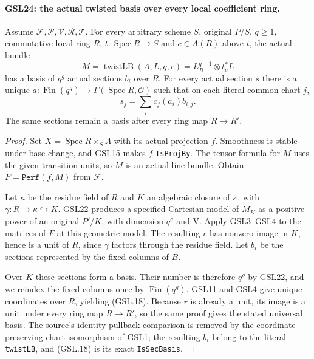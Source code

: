 \documentclass[11pt,a4paper]{article}
\numberwithin{equation}{section}
\theoremstyle{remark}\newtheorem{remark}[theorem]{Remark}
\begin{document}
\paragraph{GSL24: the actual twisted basis over every local coefficient ring.}
\label{claim:GSL24}
Assume $\mathcal F,\mathcal P,\mathcal V,\mathcal R,\mathcal T$.
For every arbitrary scheme $S$, original $P/S$, $q\ge1$,
commutative local ring $R$, $t:\operatorname{Spec}R\to S$
and $c\in A(R)$ above $t$, the actual bundle
\[
 M=\operatorname{twistLB}(A,L,q,c)
     =L_R^{q-1}\otimes t_c^*L
\]
has a basis of $q^g$ actual sections $b_i$ over $R$.
For every actual section $s$ there is a unique
$a:\operatorname{Fin}(q^g)\to\Gamma(\operatorname{Spec}R,\mathcal O)$
such that on each literal common chart $j$,
\[
 s_j=\sum_i c_f(a_i)b_{i,j}. \tag{GSL.18}
\]
The same sections remain a basis after every ring map $R\to R'$.

\begin{proof}
Set $X=\operatorname{Spec}R\times_S A$ with its actual projection
$f$.  Smoothness is stable under base change, and GSL15 makes
$f$ \texttt{Is\allowbreak Proj\allowbreak By}.  The tensor formula for $M$ uses the
given transition units, so $M$ is an actual line bundle.
Obtain $F=\texttt{Perf}(f,M)$ from $\mathcal F$.

Let $\kappa$ be the residue field of $R$ and $K$ an algebraic
closure of $\kappa$, with $\gamma:R\to\kappa\hookrightarrow K$.
GSL22 produces a specified Cartesian model of $M_K$ as a
positive power of an original $P'/K$, with dimension $q^g$
and $\mathrm V$.  Apply GSL3--GSL4 to the matrices of $F$
at this geometric model.  The resulting $r$ has nonzero
image in $K$, hence is a unit of $R$, since $\gamma$ factors
through the residue field.  Let $b_i$ be the sections
represented by the fixed columns of $B$.

Over $K$ these sections form a basis.  Their number is
therefore $q^g$ by GSL22, and we reindex the fixed columns
once by $\operatorname{Fin}(q^g)$.  GSL11 and GSL4 give
unique coordinates over $R$, yielding (GSL.18).
Because $r$ is already a unit, its image is a unit under
every ring map $R\to R'$, so the same proof gives the stated
universal basis.  The source's identity-pullback comparison
is removed by the coordinate-preserving chart isomorphism
of GSL1; the resulting $b_i$ belong to the literal
\texttt{twist\allowbreak LB}, and (GSL.18) is its exact \texttt{Is\allowbreak Sec\allowbreak Basis}.
\end{proof}
\end{document}
